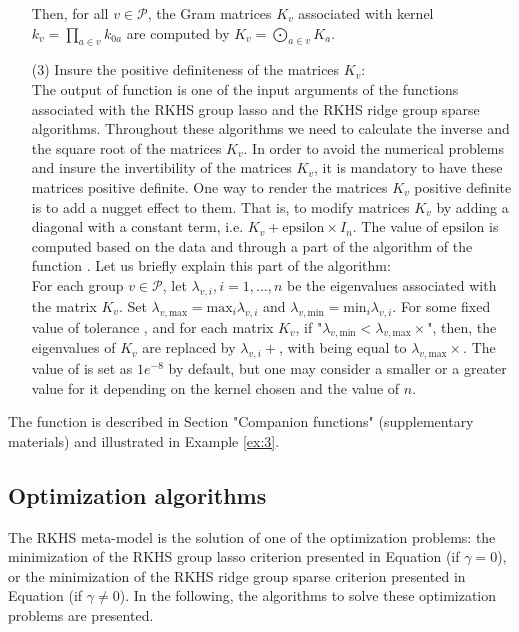 \begin{itemize}
Then, for all $v\in\mathcal{P}$, the Gram matrices $K_v$ associated with kernel $k_v=\prod_{a\in v}k_{0a}$ are computed by $K_v=\bigodot_{a\in v} K_a$.
\item[(3)] Insure the positive definiteness of the matrices $K_v$:\\
The output of function  is one of the input arguments of the functions associated with the RKHS group lasso and the RKHS ridge group sparse algorithms. Throughout these algorithms we need to calculate the inverse and the square root of the matrices $K_v$. In order to avoid the numerical problems and insure the invertibility of the matrices $K_v$, it is mandatory to have these matrices positive definite. One way to render the matrices $K_v$ positive definite is to add a nugget effect to them. That is, to modify matrices $K_v$ by adding a diagonal with a constant term, i.e. $K_v+\mbox{epsilon}\times I_n$. The value of $\mbox{epsilon}$ is computed based on the data and through a part of the algorithm of the function . 
Let us briefly explain this part of the algorithm:\\
For each group $v\in\mathcal{P}$, let $\lambda_{v,i},i=1,...,n$ be the eigenvalues associated with the matrix $K_v$. Set $\lambda_{v,\text{max}}={\text{max}}_{i}\lambda_{v,i}$ and $\lambda_{v,\text{min}}={\text{min}}_{i}\lambda_{v,i}$. For some fixed value of tolerance , and for each matrix $K_v$, if "$\lambda_{v,\text{min}} < \lambda_{v,\text{max}}\times$", then, the eigenvalues of $K_v$ are replaced by $\lambda_{v,i}+$, with  being equal to $\lambda_{v,\text{max}}\times$.
The value of  is set as $1e^{-8}$ by default, but one may consider a smaller or a greater value for it depending on the kernel chosen and the value of $n$. 
\end{itemize}
The function  is described in Section "Companion functions" (supplementary materials) and illustrated in Example \ref{ex:3}.
\subsection{Optimization algorithms}\label{subsec:optim}
The RKHS meta-model is the solution of one of the optimization problems: the minimization of the RKHS group lasso criterion presented in Equation  (if $\gamma=0$), or the minimization of the RKHS ridge group sparse criterion presented in Equation  (if $\gamma\neq0$). 
In the following, the algorithms to solve these optimization problems are presented.
